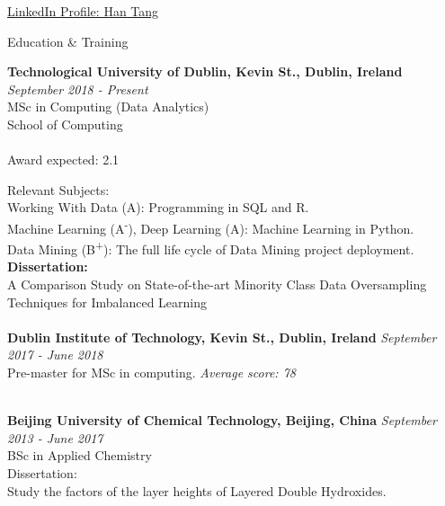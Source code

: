\documentclass{resume} %
\begin{document}
\centerline{\href{http://www.linkedin.com/in/han-tang-308a4117a}{LinkedIn Profile: Han Tang}}



\begin{rSection}{Education & Training}

{\bf Technological University of Dublin, Kevin St., Dublin, Ireland} \hfill {\em September 2018 - Present} 
\\ MSc in Computing (Data Analytics)
\\ School of Computing\\
\\Award expected: 2.1

Relevant Subjects: 
\\Working With Data (A): Programming in SQL and R.
\\Machine Learning (A\textsuperscript{-}),  Deep Learning (A): Machine Learning in Python.
\\Data Mining (B\textsuperscript{+}): The full life cycle of Data Mining project deployment.
\\ {\bf Dissertation:}
\\A Comparison Study on State-of-the-art Minority Class Data Oversampling Techniques for Imbalanced Learning
\\

\\{\bf Dublin Institute of Technology, Kevin St., Dublin, Ireland} \hfill {\em September 2017 - June 2018} 
\\ Pre-master for MSc in computing. \hfill {\em Average score: 78}


\\{\bf Beijing University of Chemical Technology, Beijing, China} \hfill {\em September 2013 - June 2017} 
\\ BSc in Applied Chemistry
\\Dissertation:
\\Study the factors of the layer heights of Layered Double Hydroxides.
\end{rSection}
\end{document}

